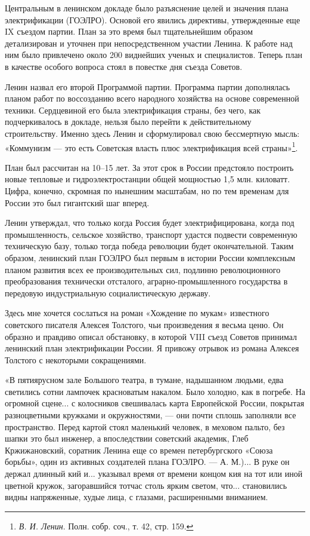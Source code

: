 \documentclass[12pt, a4paper, openany]{book}
\begin{document}
Центральным в ленинском докладе было разъяснение целей и значения плана электрификации (ГОЭЛРО). Основой его явились директивы, утвержденные еще IX съездом партии. План за это время был тщательнейшим образом детализирован и уточнен при непосредственном участии Ленина. К работе над ним было привлечено около 200 виднейших ученых и специалистов. Теперь план в качестве особого вопроса стоял в повестке дня съезда Советов.

Ленин назвал его второй Программой партии. Программа партии дополнялась планом работ по воссозданию всего народного хозяйства на основе современной техники. Сердцевиной его была электрификация страны, без чего, как подчеркивалось в докладе, нельзя было перейти к действительному строительству. Именно здесь Ленин и сформулировал свою бессмертную мысль: «Коммунизм — это есть Советская власть плюс электрификация всей страны»\footnote{\textit{В. И. Ленин}. Полн. собр. соч., т. 42, стр. 159.}.

План был рассчитан на 10–15 лет. За этот срок в России предстояло построить новые тепловые и гидроэлектростанции общей мощностью 1,5 млн. киловатт. Цифра, конечно, скромная по нынешним масштабам, но по тем временам для России это был гигантский шаг вперед.

Ленин утверждал, что только когда Россия будет электрифицирована, когда под промышленность, сельское хозяйство, транспорт удастся подвести современную техническую базу, только тогда победа революции будет окончательной. Таким образом, ленинский план ГОЭЛРО был первым в истории России комплексным планом развития всех ее производительных сил, подлинно революционного преобразования технически отсталого, аграрно-промышленного государства в передовую индустриальную социалистическую державу.

Здесь мне хочется сослаться на роман «Хождение по мукам» известного советского писателя Алексея Толстого, чьи произведения я весьма ценю. Он образно и правдиво описал обстановку, в которой VIII съезд Советов принимал ленинский план электрификации России. Я привожу отрывок из романа Алексея Толстого с некоторыми сокращениями.

«В пятиярусном зале Большого театра, в тумане, надышанном людьми, едва светились сотни лампочек красноватым накалом. Было холодно, как в погребе. На огромной сцене... с колосников свешивалась карта Европейской России, покрытая разноцветными кружками и окружностями, — они почти сплошь заполняли все пространство. Перед картой стоял маленький человек, в меховом пальто, без шапки это был инженер, а впоследствии советский академик, Глеб Кржижановский, соратник Ленина еще со времен петербургского «Союза борьбы», один из активных создателей плана ГОЭЛРО. — А. М.)... В руке он держал длинный кий и... указывал время от времени концом кия на тот или иной цветной кружок, загоравшийся тотчас столь ярким светом, что... становились видны напряженные, худые лица, с глазами, расширенными вниманием.
\end{document}
